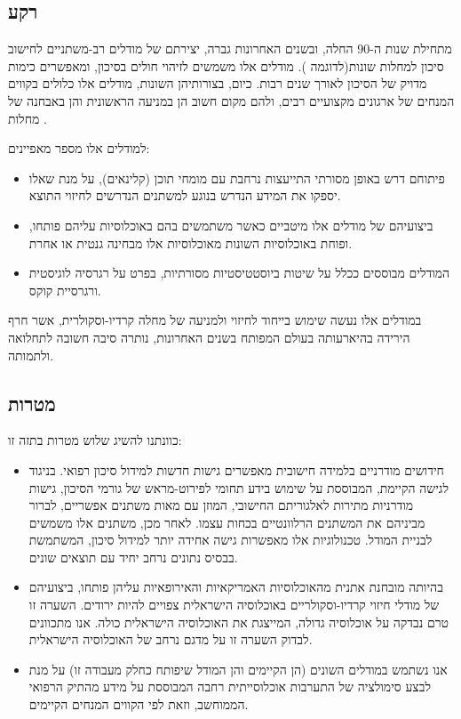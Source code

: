 \documentclass[a4paper,12pt]{article}
\begin{document}
	\begin{hebrew}
		\subsection*{רקע}
				מתחילת שנות ה-90 החלה, ובשנים האחרונות גברה, יצירתם של מודלים רב-משתניים לחישוב סיכון למחלות שונות(לדוגמה \cite{Wilson1998,Conroy2003,DAgostino2008}). מודלים אלו משמשים לזיהוי חולים בסיכון, ומאפשרים כימות מדויק של הסיכון לאורך שנים רבות\cite{Goff2014}. כיום, בצורותיהן השונות, מודלים אלו כלולים בקווים המנחים של ארגונים מקצועיים רבים, ולהם מקום חשוב הן במניעה הראשונית והן באבחנה של מחלות \cite{Graham2007,Goff2014}.
			
			למודלים אלו מספר מאפיינים:
			\begin{itemize}
				\item פיתוחם דרש באופן מסורתי התייעצות נרחבת עם מומחי תוכן (קלינאים), על מנת שאלו יספקו את המידע הנדרש בנוגע למשתנים הנדרשים לחיזוי התוצא.
				\item ביצועיהם של מודלים אלו מיטביים כאשר משתמשים בהם באוכלוסיות עליהם פותחו, ופוחת באוכלוסיות השונות מאוכלוסיות אלו מבחינה גנטית או אחרת\cite{DAgostino2001,Bastuji-Garin2002,DeFilippis2015}.
				\item המודלים מבוססים ככלל על שיטות ביוסטטיסטיות מסורתיות, בפרט על רגרסיה לוגיסטית ורגרסיית קוקס.
			\end{itemize}
		
		במודלים אלו נעשה שימוש בייחוד לחיזוי ולמניעה של מחלה קרדיו-וסקולרית, אשר חרף הירידה בהיארעותה בעולם המפותח בשנים האחרונות\cite{Koton2014,Vangen-Loenne2017}, נותרה סיבה חשובה לתחלואה ולתמותה\cite{ODonnell2016}.
				
		\subsection*{מטרות}
			כוונתנו להשיג שלוש מטרות בתזה זו:
			\begin{itemize}
				\item חידושים מודרניים בלמידה חישובית מאפשרים גישות חדשות למידול סיכון רפואי\cite{Obermeyer2016}. בניגוד לגישה הקיימת, המבוססת על שימוש בידע תחומי לפירוט-מראש של גורמי הסיכון, גישות מודרניות מתירות לאלגוריתם החישובי, המוזן עם מאות משתנים אפשריים, לברור מביניהם את המשתנים הרלוונטיים בכחות עצמו\cite{Weng2017}. לאחר מכן, משתנים אלו משמשים לבניית המודל. טכנולוגיות אלו מאפשרות גישה אחידה יותר למידול סיכון, המשתמשת בבסיס נתונים נרחב יחיד עם תוצאים שונים\cite{Rajkomar2018}.
				\item בהיותה מובחנת אתנית מהאוכלוסיות האמריקאיות והאירופאיות עליהן פותחו, ביצועיהם של מודלי חיזוי קרדיו-וסקולריים באוכלוסיה הישראלית צפויים להיות ירודים. השערה זו טרם נבדקה על אוכלוסיה גדולה, המייצגת את האוכלוסיה הישראלית כולה\cite{Lovis2015}. אנו מתכוונים לבדוק השערה זו על מדגם נרחב של האוכלוסיה הישראלית.
				\item אנו נשתמש במודלים השונים (הן הקיימים והן המודל שיפותח כחלק מעבודה זו) על מנת לבצע סימולציה של התערבות אוכלוסייתית רחבה המבוססת על מידע מהתיק הרפואי הממוחשב, וזאת לפי הקווים המנחים הקיימים\cite{Goff2014}.
			\end{itemize}
		

\end{hebrew}
\end{document}
